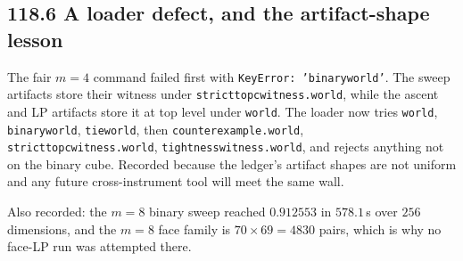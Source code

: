 \documentclass[9pt,twocolumn]{article}
\renewcommand{\_}{\CIGunderscore\allowbreak}
\begin{document}
\subsection*{118.6 A loader defect, and the artifact-shape lesson}
The fair $m=4$ command failed first with \texttt{KeyError: 'binary\_world'}. The sweep artifacts store their witness under \texttt{strict\_top\_c\_witness.world}, while the ascent and LP artifacts store it at top level under \texttt{world}. The loader now tries \texttt{world}, \texttt{binary\_world}, \texttt{tie\_world}, then \texttt{counterexample.world}, \texttt{strict\_top\_c\_witness.world}, \texttt{tightness\_witness.world}, and rejects anything not on the binary cube. Recorded because the ledger's artifact shapes are not uniform and any future cross-instrument tool will meet the same wall.

Also recorded: the $m=8$ binary sweep reached $0.912553$ in $578.1$\,s over $256$ dimensions, and the $m=8$ face family is $70\times69=4830$ pairs, which is why no face-LP run was attempted there.
\end{document}
